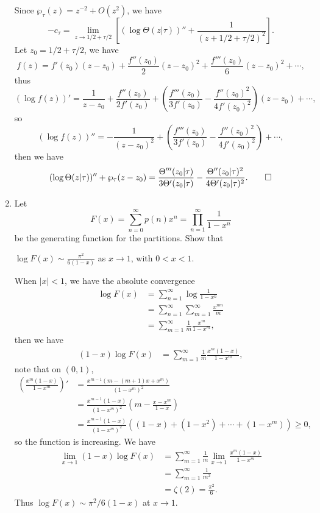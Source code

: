 \documentclass[11pt]{report}
\theoremstyle{mythm}
\let\oldendproof\endproof
\renewenvironment{proof}[1][\proofname]{%
  \oldproof[\normalfont \bfseries #1]%
}{\oldendproof}
\renewcommand*{\proofname}{Proof}
\theoremstyle{myans}
\begin{document}
\begin{enumerate}
\begin{proof}
    Since $\wp_\tau(z) = z^{-2} + O(z^2)$, we have
    \[ -c_\tau = \lim_{z\to 1/2 + \tau/2} \left[ (\log \Theta(z|\tau))'' + \frac 1{(z+1/2+\tau/2)^2} \right]. \]
    Let $z_0 = 1/2 + \tau/2$, we have
    \[ f(z) = f'(z_0)(z-z_0) + \frac{f''(z_0)}2(z-z_0)^2 + \frac{f'''(z_0)}6(z-z_0)^2 + \cdots, \]
    thus
    \[ (\log f(z))' = \frac 1{z - z_0} + \frac{f''(z_0)}{2f'(z_0)} + \left(\frac{f'''(z_0)}{3f'(z_0)}
    - \frac{f''(z_0)^2}{4f'(z_0)^2}\right)(z-z_0) + \cdots, \]
    so
    \[ (\log f(z))'' = -\frac 1{(z-z_0)^2} + \left(\frac{f'''(z_0)}{3f'(z_0)}
    - \frac{f''(z_0)^2}{4f'(z_0)^2}\right)+\cdots, \]
    then we have
    \[ (\log \Theta(z|\tau))'' + \wp_\tau(z - z_0) = \frac{\Theta'''(z_0|\tau)}{3\Theta'(z_0|\tau)}
    - \frac{\Theta''(z_0|\tau)^2}{4\Theta'(z_0|\tau)^2}. \qedhere  \]
  \end{proof}
  \setcounter{enumi}{4}
  \item Let
  \[ F(x) = \sum_{n=0}^\infty p(n)x^n = \prod_{n=1}^\infty \frac 1{1-x^n} \]
  be the generating function for the partitions. Show that
  \begin{center}
    $\displaystyle \log F(x) \sim \frac{\pi^2}{6(1-x)}$ \quad
    as $x\to 1$, with $0<x<1$.
  \end{center}
  \begin{proof}
    When $|x|<1$, we have the absolute convergence
    \begin{align*}
      \log F(x) &= \sum_{n=1}^\infty \log \frac 1{1-x^n}\\
      &= \sum_{n=1}^\infty \sum_{m=1}^\infty \frac{x^{nm}}{m}\\
      &= \sum_{m=1}^\infty \frac 1{m} \frac{x^m}{1-x^m},
    \end{align*}
    then we have
    \begin{align*}
      (1-x)\log F(x) &= \sum_{m=1}^\infty \frac 1{m} \frac{x^m (1-x)}{1-x^m},
    \end{align*}
    note that on $(0, 1)$,
    \begin{align*}
      \left(\frac{x^m(1-x)}{1-x^m}\right)' &= \frac{x^{m-1}(m-(m+1)x+x^m)}{(1-x^m)^2}\\
      &= \frac{x^{m-1}(1-x)}{(1-x^m)^2}\left(m - \frac{x-x^m}{1-x}\right)\\
      &= \frac{x^{m-1}(1-x)}{(1-x^m)^2}\left((1 - x) + (1-x^2) + \cdots + (1-x^m)\right) \geq 0,
    \end{align*}
    so the function is increasing. We have
    \begin{align*}
      \lim_{x\to 1} (1-x)\log F(x) &= \sum_{m=1}^\infty \frac 1 m \lim_{x\to 1} \frac{x^m(1-x)}{1-x^m}\\
      &= \sum_{m=1}^\infty \frac 1{m^2}\\
      &= \zeta(2) = \frac{\pi^2} 6 .
    \end{align*}
    Thus $\log F(x) \sim \pi^2 / 6(1-x)$ at $x\to 1$.
  \end{proof}
\end{enumerate}
\end{document}
